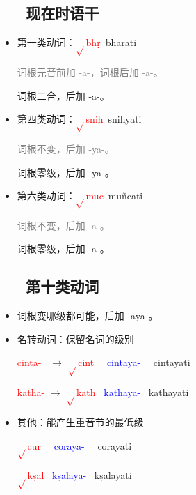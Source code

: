 \documentclass[17pt]{beamer}
\newcommand{\verbroot}[1]{\textcolor{red}{$\sqrt{}$#1}}
\newcommand{\nounstem}[1]{\textcolor{red}{#1\nobreakdash-}}
\newcommand{\verbstem}[1]{\textcolor{blue}{#1\nobreakdash-}}
\newcommand{\fullpada}[1]{\textcolor{OliveGreen}{#1}}
\newcommand{\notsoimportant}[1]{\textcolor{gray}{#1}}
\begin{document}
\subsection{~~~现在时语干}
\begin{frame}{\insertsubsection }
  \begin{itemize}
    \item 第一类动词：\verbroot{bhṛ}~\fullpada{bharati}
    
    \notsoimportant{词根元音前加 \nobreakdash-a\nobreakdash-，词根后加 \nobreakdash-a\nobreakdash-。}

    词根二合，后加 \nobreakdash-a\nobreakdash-。
    \item 第四类动词：\verbroot{snih}~\fullpada{snihyati}
      
    \notsoimportant{词根不变，后加 \nobreakdash-ya\nobreakdash-。}

    词根零级，后加 \nobreakdash-ya\nobreakdash-。
    \item 第六类动词：\verbroot{muc}~\fullpada{muñcati}
    
    \notsoimportant{词根不变，后加 \nobreakdash-a\nobreakdash-。}

    词根零级，后加 \nobreakdash-a\nobreakdash-。
  \end{itemize}
\end{frame}

\subsection{~~~第十类动词}
\begin{frame}{\insertsubsection}
  \begin{itemize}
    \item
      词根变哪级都可能，后加 \nobreakdash-aya\nobreakdash-。
    \item 名转动词：保留名词的级别
    
    \nounstem{cintā} ~$\rightarrow$ \verbroot{cint} ~~\verbstem{cintaya} ~~\fullpada{cintayati}

    \nounstem{kathā} $\rightarrow$ \verbroot{kath} ~\verbstem{kathaya} ~\fullpada{kathayati}
    \item 其他：能产生重音节的最低级

    \verbroot{cur} ~~\verbstem{coraya} ~~\fullpada{corayati}

    \verbroot{kṣal} ~\verbstem{kṣālaya} ~\fullpada{kṣālayati}
  \end{itemize}    
\end{frame}
\end{document}
